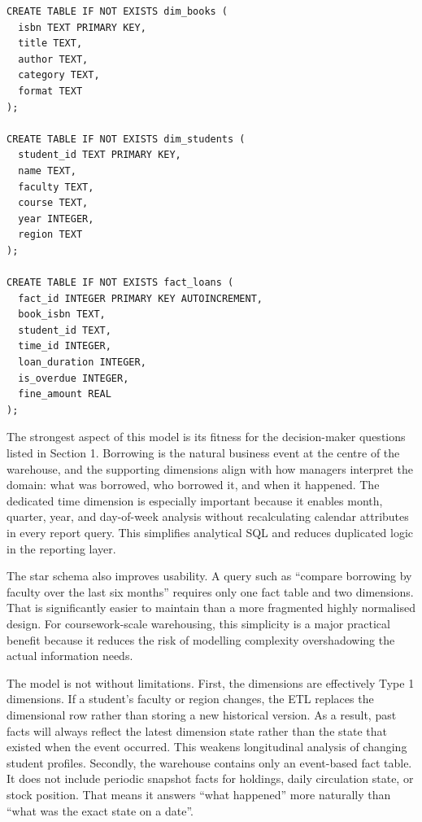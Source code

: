 \documentclass[12pt,a4paper]{article}
\begin{document}
\begin{lstlisting}[style=reportcode,caption={Warehouse schema excerpt from server/db.ts}]
CREATE TABLE IF NOT EXISTS dim_books (
  isbn TEXT PRIMARY KEY,
  title TEXT,
  author TEXT,
  category TEXT,
  format TEXT
);

CREATE TABLE IF NOT EXISTS dim_students (
  student_id TEXT PRIMARY KEY,
  name TEXT,
  faculty TEXT,
  course TEXT,
  year INTEGER,
  region TEXT
);

CREATE TABLE IF NOT EXISTS fact_loans (
  fact_id INTEGER PRIMARY KEY AUTOINCREMENT,
  book_isbn TEXT,
  student_id TEXT,
  time_id INTEGER,
  loan_duration INTEGER,
  is_overdue INTEGER,
  fine_amount REAL
);
\end{lstlisting}

The strongest aspect of this model is its fitness for the decision-maker questions listed in Section 1. Borrowing is the natural business event at the centre of the warehouse, and the supporting dimensions align with how managers interpret the domain: what was borrowed, who borrowed it, and when it happened. The dedicated time dimension is especially important because it enables month, quarter, year, and day-of-week analysis without recalculating calendar attributes in every report query. This simplifies analytical SQL and reduces duplicated logic in the reporting layer.

The star schema also improves usability. A query such as ``compare borrowing by faculty over the last six months'' requires only one fact table and two dimensions. That is significantly easier to maintain than a more fragmented highly normalised design. For coursework-scale warehousing, this simplicity is a major practical benefit because it reduces the risk of modelling complexity overshadowing the actual information needs.

The model is not without limitations. First, the dimensions are effectively Type 1 dimensions. If a student's faculty or region changes, the ETL replaces the dimensional row rather than storing a new historical version. As a result, past facts will always reflect the latest dimension state rather than the state that existed when the event occurred. This weakens longitudinal analysis of changing student profiles. Secondly, the warehouse contains only an event-based fact table. It does not include periodic snapshot facts for holdings, daily circulation state, or stock position. That means it answers ``what happened'' more naturally than ``what was the exact state on a date''.
\end{document}
